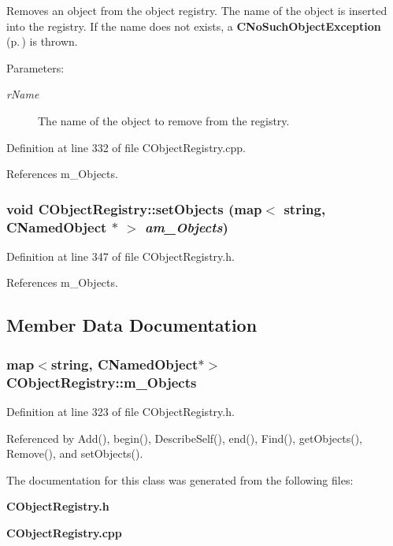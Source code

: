 Removes an object from the object registry. The name of the object is inserted into the registry. If the name does not exists, a {\bf CNo\-Such\-Object\-Exception} {\rm (p.\,\pageref{classCNoSuchObjectException})} is  thrown.\begin{Desc}
\item[Parameters: ]\par
\begin{description}
\item[{\em 
r\-Name}]The name of the object to remove from the registry. \end{description}
\end{Desc}


Definition at line 332 of file CObject\-Registry.cpp.

References m\_\-Objects.
\subsubsection{\setlength{\rightskip}{0pt plus 5cm}void CObject\-Registry::set\-Objects (map$<$ string, {\bf CNamed\-Object} $\ast$ $>$ {\em am\_\-Objects})\hspace{0.3cm}{\tt  [inline, protected]}}\label{classCObjectRegistry_b0}




Definition at line 347 of file CObject\-Registry.h.

References m\_\-Objects.

\subsection{Member Data Documentation}
\subsubsection{\setlength{\rightskip}{0pt plus 5cm}map$<$string, {\bf CNamed\-Object}$\ast$$>$ CObject\-Registry::m\_\-Objects\hspace{0.3cm}{\tt  [private]}}\label{classCObjectRegistry_o0}




Definition at line 323 of file CObject\-Registry.h.

Referenced by Add(), begin(), Describe\-Self(), end(), Find(), get\-Objects(), Remove(), and set\-Objects().

The documentation for this class was generated from the following files:\begin{CompactItemize}
\item 
{\bf CObject\-Registry.h}\item 
{\bf CObject\-Registry.cpp}\end{CompactItemize}
